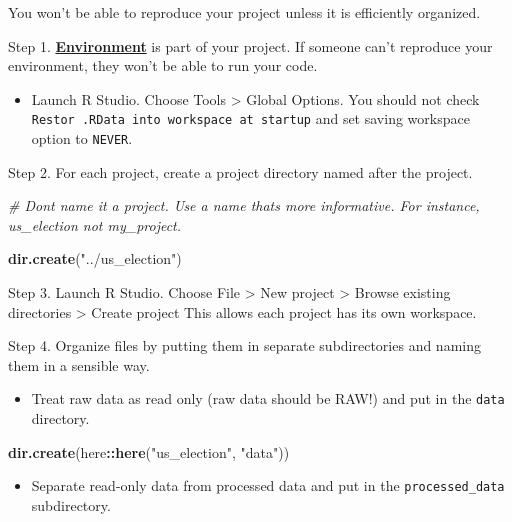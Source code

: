 \documentclass[
]{book}
\newenvironment{Shaded}{\begin{snugshade}}{\end{snugshade}}
\newcommand{\CommentTok}[1]{\textcolor[rgb]{0.56,0.35,0.01}{\textit{#1}}}
\newcommand{\KeywordTok}[1]{\textcolor[rgb]{0.13,0.29,0.53}{\textbf{#1}}}
\newcommand{\NormalTok}[1]{#1}
\newcommand{\OperatorTok}[1]{\textcolor[rgb]{0.81,0.36,0.00}{\textbf{#1}}}
\newcommand{\StringTok}[1]{\textcolor[rgb]{0.31,0.60,0.02}{#1}}
\providecommand{\tightlist}{%
  \setlength{\itemsep}{0pt}\setlength{\parskip}{0pt}}
\begin{document}
You won't be able to reproduce your project unless it is efficiently organized.

Step 1. \href{https://environments.rstudio.com/}{\textbf{Environment}} is part of your project. If someone can't reproduce your environment, they won't be able to run your code.

\begin{itemize}
\tightlist
\item
  Launch R Studio. Choose Tools \textgreater{} Global Options. You should not check \texttt{Restor\ .RData\ into\ workspace\ at\ startup} and set saving workspace option to \texttt{NEVER}.
\end{itemize}

Step 2. For each project, create a project directory named after the project.

\begin{Shaded}
\begin{Highlighting}[]
\CommentTok{\# Don\textquotesingle{}t name it a project. Use a name that\textquotesingle{}s more informative. For instance, us\_election not my\_project.}

\KeywordTok{dir.create}\NormalTok{(}\StringTok{"../us\_election"}\NormalTok{)}
\end{Highlighting}
\end{Shaded}

Step 3. Launch R Studio. Choose File \textgreater{} New project \textgreater{} Browse existing directories \textgreater{} Create project This allows each project has its own workspace.

Step 4. Organize files by putting them in separate subdirectories and naming them in a sensible way.

\begin{itemize}
\tightlist
\item
  Treat raw data as read only (raw data should be RAW!) and put in the \texttt{data} directory.
\end{itemize}

\begin{Shaded}
\begin{Highlighting}[]
\KeywordTok{dir.create}\NormalTok{(here}\OperatorTok{::}\KeywordTok{here}\NormalTok{(}\StringTok{"us\_election"}\NormalTok{, }\StringTok{"data"}\NormalTok{))}
\end{Highlighting}
\end{Shaded}

\begin{itemize}
\tightlist
\item
  Separate read-only data from processed data and put in the \texttt{processed\_data} subdirectory.
\end{itemize}
\end{document}
